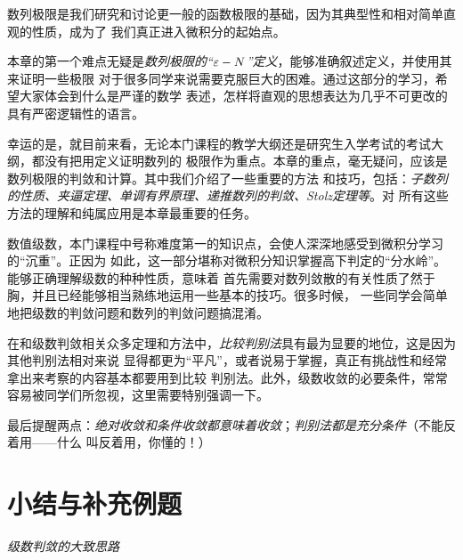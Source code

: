 数列极限是我们研究和讨论更一般的函数极限的基础，因为其典型性和相对简单直观的性质，成为了
我们真正进入微积分的起始点。

本章的第一个难点无疑是{\it 数列极限的“$\varepsilon-N$”定义}，能够准确叙述定义，并使用其来证明一些极限
对于很多同学来说需要克服巨大的困难。通过这部分的学习，希望大家体会到什么是严谨的数学
表述，怎样将直观的思想表达为几乎不可更改的具有严密逻辑性的语言。

幸运的是，就目前来看，无论本门课程的教学大纲还是研究生入学考试的考试大纲，都没有把用定义证明数列的
极限作为重点。本章的重点，毫无疑问，应该是数列极限的判敛和计算。其中我们介绍了一些重要的方法
和技巧，包括：{\it 子数列的性质、夹逼定理、单调有界原理、递推数列的判敛、Stolz定理等}。对
所有这些方法的理解和纯属应用是本章最重要的任务。

数值级数，本门课程中号称难度第一的知识点，会使人深深地感受到微积分学习的“沉重”。正因为
如此，这一部分堪称对微积分知识掌握高下判定的“分水岭”。能够正确理解级数的种种性质，意味着
首先需要对数列敛散的有关性质了然于胸，并且已经能够相当熟练地运用一些基本的技巧。很多时候，
一些同学会简单地把级数的判敛问题和数列的判敛问题搞混淆。

在和级数判敛相关众多定理和方法中，{\it 比较判别法}具有最为显要的地位，这是因为其他判别法相对来说
显得都更为“平凡”，或者说易于掌握，真正有挑战性和经常拿出来考察的内容基本都要用到比较
判别法。此外，级数收敛的必要条件，常常容易被同学们所忽视，这里需要特别强调一下。

最后提醒两点：{\it 绝对收敛和条件收敛都意味着收敛}；{\it 判别法都是充分条件}（不能反着用——什么
叫反着用，你懂的！）

\newpage

\section*{小结与补充例题}

\begin{center}
	
	{\it 级数判敛的大致思路}
\end{center}

